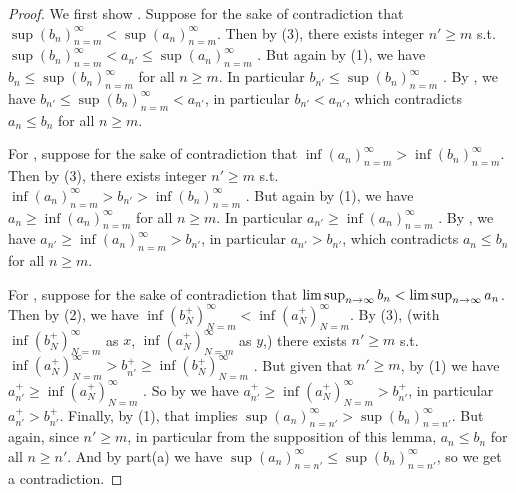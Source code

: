 \begin{proof}
We first show .
Suppose for the sake of contradiction that \(\sup(b_n)_{n = m}^{\infty} < \sup(a_n)_{n = m}^{\infty}\).
Then by (3), there exists integer \(n' \ge m\) s.t. \(\sup(b_n)_{n = m}^{\infty} < a_{n'} \le \sup(a_n)_{n = m}^{\infty}\) .
But again by (1), we have \(b_n \le \sup(b_n)_{n = m}^{\infty}\) for all \(n \ge m\).
In particular \(b_{n'} \le \sup(b_n)_{n = m}^{\infty}\) .
By , we have \(b_{n'} \le \sup(b_n)_{n = m}^{\infty} < a_{n'}\), in particular \(b_{n'} < a_{n'}\), which contradicts \(a_n \le b_n\) for all \(n \ge m\).

For , suppose for the sake of contradiction that \(\inf(a_n)_{n = m}^{\infty} > \inf(b_n)_{n = m}^{\infty} \).
Then by (3), there exists integer \(n' \ge m\) s.t. \(\inf(a_n)_{n = m}^{\infty} > b_{n'} > \inf(b_n)_{n = m}^{\infty} \) .
But again by (1), we have \(a_n \ge \inf(a_n)_{n = m}^{\infty}\) for all \(n \ge m\).
In particular \(a_{n'} \ge \inf(a_n)_{n = m}^{\infty}\) .
By , we have \(a_{n'} \ge \inf(a_n)_{n = m}^{\infty} > b_{n'}\), in particular \(a_{n'} > b_{n'}\), which contradicts \(a_n \le b_n\) for all \(n \ge m\).

For , suppose for the sake of contradiction that \(\limsup_{n \to \infty} b_n < \limsup_{n \to \infty} a_n\).
Then by (2), we have \(\inf (b_N^+)_{N = m}^{\infty} < \inf (a_N^+)_{N = m}^{\infty}\).
By (3), (with \(\inf (b_N^+)_{N = m}^{\infty}\) as \(x\), \(\inf (a_N^+)_{N = m}^{\infty}\) as \(y\),) there exists \(n' \ge m\) s.t. \(\inf (a_N^+)_{N = m}^{\infty} > b_{n'}^+ \ge \inf (b_N^+)_{N = m}^{\infty}\) .
But given that \(n' \ge m\), by (1) we have \(a_{n'}^+ \ge \inf (a_N^+)_{N = m}^{\infty}\) .
So by  we have \(a_{n'}^+ \ge \inf (a_N^+)_{N = m}^{\infty} > b_{n'}^+\), in particular \(a_{n'}^+ > b_{n'}^+\).
Finally, by (1), that implies \(\sup(a_n)_{n = n'}^{\infty} > \sup(b_n)_{n = n'}^{\infty}\).
But again, since \(n' \ge m\), in particular from the supposition of this lemma, \(a_n \le b_n\) for all \(n \ge n'\).
And by part(a) we have \(\sup(a_n)_{n = n'}^{\infty} \le \sup(b_n)_{n = n'}^{\infty}\), so we get a contradiction.


\end{proof}
